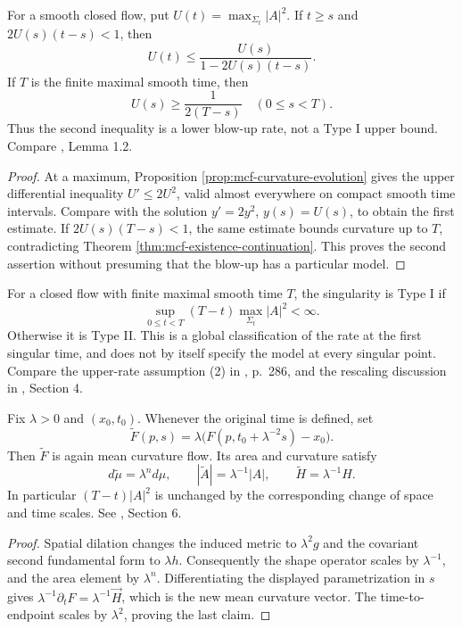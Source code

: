 \begin{proposition}\label{prop:mcf-curvature-rate}
For a smooth closed flow, put $U(t)=\max_{\Sigma_t}|A|^2$. If $t\geq s$ and $2U(s)(t-s)<1$, then
\[
 U(t)\leq\frac{U(s)}{1-2U(s)(t-s)}.
\]
If $T$ is the finite maximal smooth time, then
\[
 U(s)\geq\frac{1}{2(T-s)}\quad(0\leq s<T).
\]
Thus the second inequality is a lower blow-up rate, not a Type I upper bound. Compare \cite{Hui90}, Lemma 1.2.
\end{proposition}
\begin{proof}
At a maximum, Proposition \ref{prop:mcf-curvature-evolution} gives the upper differential inequality $U'\leq2U^2$, valid almost everywhere on compact smooth time intervals. Compare with the solution $y'=2y^2$, $y(s)=U(s)$, to obtain the first estimate. If $2U(s)(T-s)<1$, the same estimate bounds curvature up to $T$, contradicting Theorem \ref{thm:mcf-existence-continuation}. This proves the second assertion without presuming that the blow-up has a particular model.
\end{proof}

\begin{definition}\label{def:mcf-singularity-types}
For a closed flow with finite maximal smooth time $T$, the singularity is Type I if
\[
 \sup_{0\leq t<T}(T-t)\max_{\Sigma_t}|A|^2<\infty.
\]
Otherwise it is Type II. This is a global classification of the rate at the first singular time, and does not by itself specify the model at every singular point. Compare the upper-rate assumption (2) in \cite{Hui90}, p.~286, and the rescaling discussion in \cite{HP99}, Section 4.
\end{definition}

\begin{proposition}\label{prop:mcf-parabolic-rescaling}
Fix $\lambda>0$ and $(x_0,t_0)$. Whenever the original time is defined, set
\[
 \widetilde F(p,s)=\lambda\bigl(F(p,t_0+\lambda^{-2}s)-x_0\bigr).
\]
Then $\widetilde F$ is again mean curvature flow. Its area and curvature satisfy
\[
 d\widetilde\mu=\lambda^n d\mu,\qquad
 |\widetilde A|=\lambda^{-1}|A|,\qquad
 \widetilde H=\lambda^{-1}H.
\]
In particular $(T-t)|A|^2$ is unchanged by the corresponding change of space and time scales. See \cite{WhiMCF15}, Section 6.
\end{proposition}
\begin{proof}
Spatial dilation changes the induced metric to $\lambda^2g$ and the covariant second fundamental form to $\lambda h$. Consequently the shape operator scales by $\lambda^{-1}$, and the area element by $\lambda^n$. Differentiating the displayed parametrization in $s$ gives $\lambda^{-1}\partial_tF=\lambda^{-1}\vec H$, which is the new mean curvature vector. The time-to-endpoint scales by $\lambda^2$, proving the last claim.
\end{proof}

